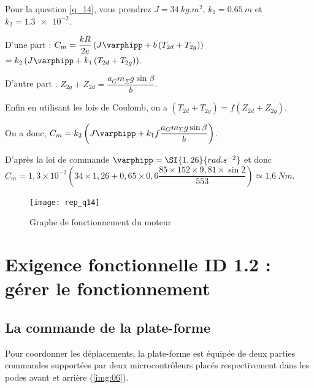 Pour la question \ref{q_14}, vous prendrez $J =\SI{34}{kg.m^2}$, $k_1 =\SI{0,65}{m}$ et $k_2 = \num{1,3e-2}$.

\ifprof
\begin{corrige}
D'une part : $  C_m  =\dfrac{kR}{2e} \left(J\varphipp  +b\left( T_{2d} +T_{2g} \right)\right) $ 
$=k_2 \left(J\varphipp  +k_1\left( T_{2d} +T_{2g} \right)\right) $.

D'autre part : $Z_{2g}+ Z_{2d}= \dfrac{ a_G  m_\Sigma g \sin \beta  }{b} $.

Enfin en utilisant les lois de Coulomb, on a $\left( T_{2d} +T_{2g} \right) = f\left( Z_{2d} +Z_{2g} \right)$.

On a donc, $  C_m  =k_2 \left(J\varphipp  +k_1f\dfrac{ a_G  m_\Sigma g \sin \beta  }{b}\right) $.

D'après la loi de commande $\varphipp = \SI{1,26}{rad.s^{-2}}$
et donc $C_m = 1,3\times 10^{-2}\left(34\times 1,26 + 0,65 \times 0,6 \dfrac{ 85 \times 152 \times  9,81 \times  \sin 2 }{553}\right) \simeq \SI{1,6}{Nm}$.

\end{corrige}
\else
\fi


\ifprof
\else
\begin{figure}[H]
\centering
\texttt{[image: rep\_q14]}
\caption{Graphe de fonctionnement du moteur\label{rep_q14}}
\end{figure}
\fi


\section{Exigence fonctionnelle ID 1.2 : gérer le fonctionnement}
\subsection{La commande de la plate-forme}

\ifprof
\else

Pour coordonner les déplacements, la plate-forme est équipée de deux parties commandes supportées par deux microcontrôleurs placés respectivement dans les podes avant et arrière (\autoref{img:06}).

